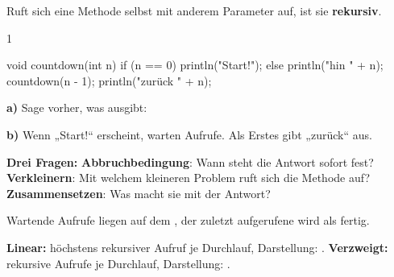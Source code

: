 \documentclass[11pt,a4paper]{article}
\begin{document}

Ruft sich eine Methode selbst mit anderem Parameter auf, ist sie \textbf{rekursiv}. 

\begin{aufgabe}{1}
\begin{minipage}[t]{0.43\linewidth}
\vspace{0pt}
\begin{java}[basicstyle=\ttfamily\footnotesize]
void countdown(int n) {
   if (n == 0) {
      println("Start!");
   } else {
      println("hin " + n);
      countdown(n - 1);
      println("zurück " + n);
   }
}
\end{java}
\end{minipage}\hfill
\begin{minipage}[t]{0.54\linewidth}
\vspace{0pt}\lueckentext
\textbf{a)} Sage vorher, was  ausgibt:\par
{}
\textbf{b)} Wenn „Start!“ erscheint, warten  Aufrufe. Als Erstes gibt  „zurück“ aus.
\end{minipage}
\end{aufgabe}

\begin{merke}
\textbf{Drei Fragen:}  \textbf{Abbruchbedingung}: Wann steht die Antwort sofort fest?  \textbf{Verkleinern}: Mit welchem kleineren Problem ruft sich die Methode auf?  \textbf{Zusammensetzen}: Was macht sie mit der Antwort?\par
\lueckentext Wartende Aufrufe liegen auf dem , der zuletzt aufgerufene wird als  fertig.\par
\textbf{Linear:} höchstens  rekursiver Aufruf je Durchlauf, Darstellung: .
\textbf{Verzweigt:}  rekursive Aufrufe je Durchlauf, Darstellung: .
\end{merke}
\end{document}
